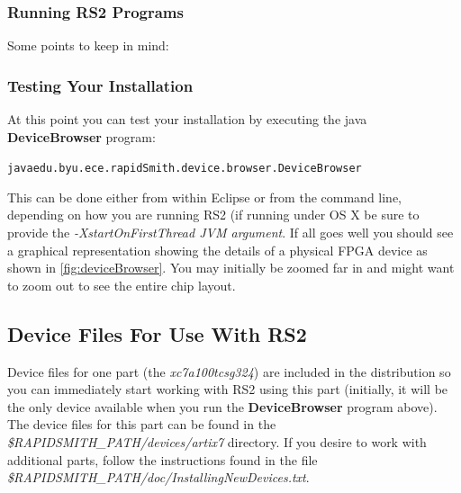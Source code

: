 \documentclass[10pt]{article}
\renewcommand{\texttt}[1]{%
  \begingroup
  \ttfamily
  \begingroup\lccode`~=`/\lowercase{\endgroup\def~}{/\discretionary{}{}{}}%
  \begingroup\lccode`~=`[\lowercase{\endgroup\def~}{[\discretionary{}{}{}}%
  \begingroup\lccode`~=`.\lowercase{\endgroup\def~}{.\discretionary{}{}{}}%
  \catcode`/=\active\catcode`[=\active\catcode`.=\active
  \scantokens{#1\noexpand}%
  \endgroup
}
\newcommand{\env}[1]{{\texttt{#1}}}
\newcommand{\fil}[1]{{\em #1}}
\newcommand{\opt}[1]{{\em #1}}
\newcommand{\pgm}[1]{{\textbf{#1}}}
\newcommand{\dir}[1]{{\em #1}}
\newenvironment{code}{\begin{center} \begin{minipage}{6in} \noindent \begin{alltt}}{\end{alltt} \end{minipage} \end{center}}
\begin{document}
\subsubsection{Running RS2 Programs}
Some points to keep in mind:

\subsubsection{Testing Your Installation}
\noindent At this point you can test your installation by executing the java
\pgm{DeviceBrowser} program: 
\vspace{-0.15in}  \begin{code}
java edu.byu.ece.rapidSmith.device.browser.DeviceBrowser
\end{code}    

\noindent This can be done either from within Eclipse or from the command line,
depending on how you are running RS2 (if running under OS X be sure to provide the
\opt{-XstartOnFirstThread JVM argument}. If all goes well you should see a
graphical representation showing the details of a physical FPGA device as shown
in \autoref{fig:deviceBrowser}.  You may initially be zoomed far in and might
want to zoom out to see the entire chip layout.

\subsection{Device Files For Use With RS2}
Device files for one part (the {\em xc7a100tcsg324}) are included in the
distribution so you can immediately start working with RS2 using this part (initially, it
will be the only device available when you run the \pgm{DeviceBrowser} program
above).  The device files for this part can be found in the
\dir{\${RAPIDSMITH\_PATH}/devices/artix7} directory. If you desire to work with
additional parts, follow the instructions found in the file
\fil{\$RAPIDSMITH\_PATH/\-doc/Installing\-NewDevices.txt}.
\end{document}
